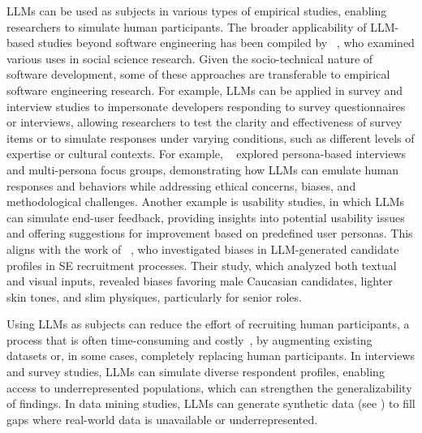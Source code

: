 LLMs can be used as subjects in various types of empirical studies, enabling researchers to simulate human participants.
The broader applicability of LLM-based studies beyond software engineering has been compiled by \citeauthor{DBLP:journals/ipm/XuSRGPLSH24}~\cite{DBLP:journals/ipm/XuSRGPLSH24}, who examined various uses in social science research.
Given the socio-technical nature of software development, some of these approaches are transferable to empirical software engineering research.
For example, LLMs can be applied in survey and interview studies to impersonate developers responding to survey questionnaires or interviews, allowing researchers to test the clarity and effectiveness of survey items or to simulate responses under varying conditions, such as different levels of expertise or cultural contexts.
For example, \citeauthor{DBLP:journals/ase/GerosaTSS24}~\cite{DBLP:journals/ase/GerosaTSS24} explored persona-based interviews and multi-persona focus groups, demonstrating how LLMs can emulate human responses and behaviors while addressing ethical concerns, biases, and methodological challenges.
Another example is usability studies, in which LLMs can simulate end-user feedback, providing insights into potential usability issues and offering suggestions for improvement based on predefined user personas. This aligns with the work of \citeauthor{bano2025doessoftwareengineerlook}~\cite{bano2025doessoftwareengineerlook}, who investigated biases in LLM-generated candidate profiles in SE recruitment processes.
Their study, which analyzed both textual and visual inputs, revealed biases favoring male Caucasian candidates, lighter skin tones, and slim physiques, particularly for senior roles.


Using LLMs as subjects can reduce the effort of recruiting human participants, a process that is often time-consuming and costly~\cite{DBLP:conf/vl/Madampe0HO24}, by augmenting existing datasets or, in some cases, completely replacing human participants. 
In interviews and survey studies, LLMs can simulate diverse respondent profiles, enabling access to underrepresented populations, which can strengthen the generalizability of findings. 
In data mining studies, LLMs can generate synthetic data (see \synthesis) to fill gaps where real-world data is unavailable or underrepresented.


